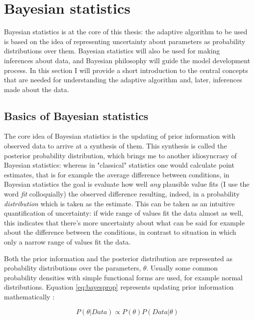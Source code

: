 \documentclass{article}\usepackage{knitr}
\begin{document}
\section{Bayesian statistics}
\label{sec:bayes}

Bayesian statistics is at the core of this thesis: the adaptive algorithm to be used is based on the idea of representing uncertainty about parameters as probability distributions over them. Bayesian statistics will also be used for making inferences about data, and Bayesian philosophy will guide the model development process. In this section I will provide a short introduction to the central concepts that are needed for understanding the adaptive algorithm and, later, inferences made about the data. 

\subsection{Basics of Bayesian statistics}

The core idea of Bayesian statistics is the updating of prior information with observed data to arrive at a synthesis of them. This synthesis is called the posterior probability distribution, which brings me to another idiosyncrasy of Bayesian statistics: whereas in "classical" statistics one would calculate point estimates, that is for example the average difference between conditions, in Bayesian statistics the goal is evaluate how well \textit{any} plausible value fits (I use the word \textit{fit} colloquially) the observed difference resulting, indeed,  in a probability \textit{distribution} which is taken as the estimate. This can be taken as an intuitive quantification of uncertainty: if wide range of values fit the data almost as well, this indicates that there's more uncertainty about what can be said for example about the difference between the conditions, in contrast to situation in which only a narrow range of values fit the data.

Both the prior information and the posterior distribution are represented as probability distributions over the parameters, $\theta$. Usually some common probability densities with simple functional forms are used, for example normal distributions. Equation \ref{eq:bayesprop} represents updating prior information mathematically \citep{kruschke2015}:

\begin{equation}
P(\theta | Data) \propto P(\theta) P(Data | \theta)
\label{eq:bayesprop}
\end{equation} 
\end{document}
